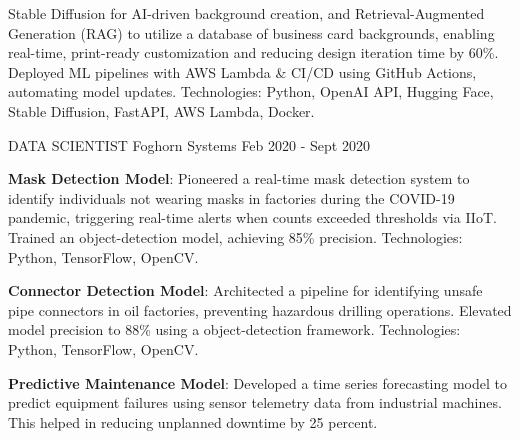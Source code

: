 \begin{cventries}
{\begin{cvitems}
{      Stable Diffusion for AI-driven background creation, and Retrieval-Augmented Generation (RAG) to utilize a database of business card backgrounds, enabling real-time, print-ready customization and reducing design iteration time by 60\%. 
      \newline
      Deployed ML pipelines with AWS Lambda \& CI/CD using GitHub Actions, automating model updates.
      \newline
      Technologies: Python, OpenAI API, Hugging Face, Stable Diffusion, FastAPI, AWS Lambda, Docker.}
	\end{cvitems}
    }
\vspace{2em} %
  \cventry
    {DATA SCIENTIST} %
    {Foghorn Systems} %
    {} %
    {Feb 2020 - Sept 2020} %
    {
      \begin{cvitems} %
        \item{\textbf{Mask Detection Model}: \newline 
        Pioneered a real-time mask detection system to identify individuals not wearing masks in factories during the COVID-19 pandemic, triggering 
        real-time alerts when counts exceeded thresholds via IIoT. \newline
        Trained an  object-detection model, 
        achieving 85\% precision. \newline Technologies: Python, TensorFlow, OpenCV.}        
        \item{\textbf{Connector Detection Model}: \newline Architected a pipeline for identifying unsafe pipe connectors in oil factories, preventing 
        hazardous drilling operations. \newline
        Elevated model precision to 88\% using a  object-detection framework. \newline
        Technologies: Python, TensorFlow, OpenCV.}
        \item{\textbf{Predictive Maintenance Model}: \newline Developed a time series forecasting model to predict equipment failures using sensor telemetry data from industrial machines. \newline
        This helped in reducing unplanned downtime by 25 percent. \newline 
}
\end{cvitems}}
\end{cventries}
